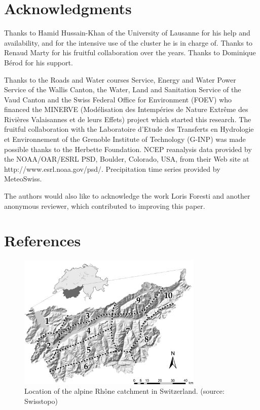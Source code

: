 \documentclass[review]{elsarticle}
\begin{document}
\section*{Acknowledgments}
Thanks to Hamid Hussain-Khan of the University of Lausanne for his help and availability, and for the intensive use of the cluster he is in charge of. Thanks to Renaud Marty for his fruitful collaboration over the years. Thanks to Dominique B\'{e}rod for his support.

Thanks to the Roads and Water courses Service, Energy and Water Power Service of the Wallis Canton, the Water, Land and Sanitation Service of the Vaud Canton and the Swiss Federal Office for Environment (FOEV) who financed the MINERVE (Mod\'{e}lisation des Intemp\'{e}ries de Nature Extr\^{e}me des Rivi\`{e}res Valaisannes et de leurs Effets) project which started this research. The fruitful collaboration with the Laboratoire d'Etude des Transferts en Hydrologie et Environnement of the Grenoble Institute of Technology (G-INP) was made possible thanks to the Herbette Foundation. NCEP reanalysis data provided by the NOAA/OAR/ESRL PSD, Boulder, Colorado, USA, from their Web site at http://www.esrl.noaa.gov/psd/. Precipitation time series provided by MeteoSwiss. 

The authors would also like to acknowledge the work Loris Foresti and another anonymous reviewer, which contributed to improving this paper. 

\section*{References}

%


\clearpage


\begin{figure}[t]
	\centerline{\includegraphics[width=8.8cm]{figures/fig01.pdf}}
	\caption{Location of the alpine Rh\^{o}ne catchment in Switzerland. (source: Swisstopo)}
	\label{fig:map}
\end{figure}
\end{document}
